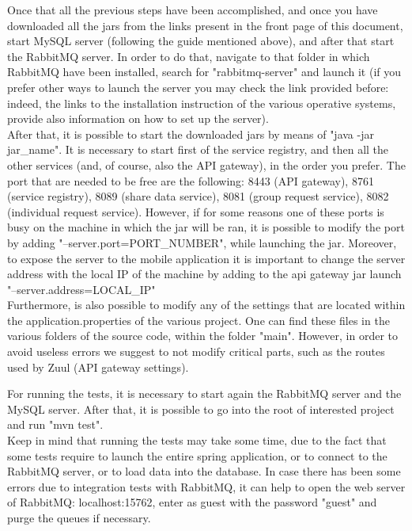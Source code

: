 Once that all the previous steps have been accomplished, and once you have downloaded all the jars from the links present in the front page
of this document, start MySQL server (following the guide mentioned above), and after that start the RabbitMQ server. In order to do that, 
navigate to that folder in which RabbitMQ have been installed, search for "rabbitmq-server" and launch it (if you prefer other ways to launch
the server you may check the link provided before: indeed, the links to the installation instruction of the various operative systems,
provide also information on how to set up the server). \\
After that, it is possible to start the downloaded jars by means of "java -jar jar\_name". 
It is necessary to start first of the service registry, and then all the other services (and, of course, also the API gateway), in the
order you prefer. 
The port that are needed to be free are the following: 8443 (API gateway), 8761 (service registry), 8089 (share data service), 8081 (group
request service), 8082 (individual request service). However, if for some reasons one of these ports is busy on the
machine in which the jar will be ran, it is possible to modify the port by adding "--server.port=PORT\_NUMBER", while launching the jar. Moreover, to expose the server to the mobile application it is important to change the server address with the local IP of the machine by adding to the api gateway jar launch "--server.address=LOCAL\_IP" \\
Furthermore, is also possible to modify any of the settings that are located within the application.properties of the various project.
One can find these files in the various folders of the source code, within the folder "main". However, in order to avoid useless errors
we suggest to not modify critical parts, such as the routes used by Zuul (API gateway settings). \\

\par 
For running the tests, it is necessary to start again the RabbitMQ server and the MySQL server. After that, it is possible to go into
the root of interested project and run "mvn test". \\
Keep in mind that running the tests may take some time, due to the fact that some tests require to launch the entire spring application,
or to connect to the RabbitMQ server, or to load data into the database. In case there has been some errors due to integration 
tests with RabbitMQ, it can help to open the web server of RabbitMQ: localhost:15762, enter as guest with the password "guest" 
and purge the queues if necessary.

